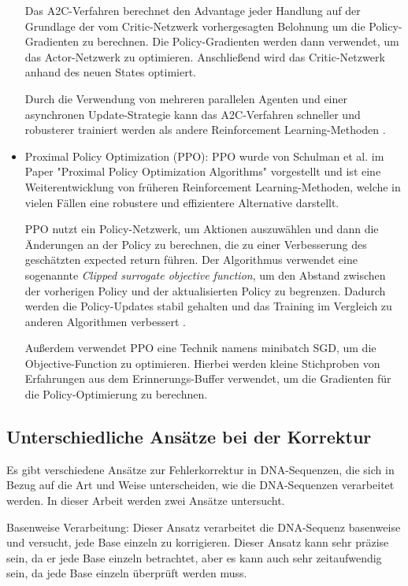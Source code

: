 \documentclass[oneside,bibliography=totocnumbered,BCOR=5mm]{scrbook}%
\theoremstyle{definition}
\theoremstyle{definition}
\theoremstyle{definition}
\theoremstyle{definition}
\theoremstyle{definition}
\theoremstyle{definition}
\begin{document}
\begin{itemize}
  Das A2C-Verfahren berechnet den Advantage jeder Handlung auf der Grundlage der
  vom Critic-Netzwerk vorhergesagten Belohnung um die Policy-Gradienten zu berechnen. 
  Die Policy-Gradienten werden dann verwendet, um das Actor-Netzwerk zu optimieren. 
  Anschließend wird das Critic-Netzwerk anhand des neuen States optimiert.
  
  Durch die Verwendung von mehreren parallelen Agenten und einer asynchronen 
  Update-Strategie kann das A2C-Verfahren schneller und robusterer trainiert 
  werden als andere Reinforcement Learning-Methoden \autocite[Seite 3]{A2C}. 


  \item Proximal Policy Optimization (PPO): PPO wurde von Schulman et al. im Paper "Proximal Policy Optimization Algorithms" 
  vorgestellt und ist eine Weiterentwicklung von früheren Reinforcement Learning-Methoden, welche in
  vielen Fällen eine robustere und effizientere Alternative darstellt.

  PPO nutzt ein Policy-Netzwerk, um Aktionen auszuwählen und dann die Änderungen 
  an der Policy zu berechnen, die zu einer Verbesserung des geschätzten expected return führen. 
  Der Algorithmus verwendet eine sogenannte \textit{Clipped surrogate objective function}, 
  um den Abstand zwischen der vorherigen Policy und der aktualisierten Policy zu begrenzen. \autocite[Seite 3]{PPO}
  Dadurch werden die Policy-Updates stabil gehalten und das Training im Vergleich zu anderen Algorithmen verbessert \autocite[Seite 7]{PPO}.
  
  Außerdem verwendet PPO eine Technik namens minibatch SGD, um die Objective-Function zu optimieren. 
  Hierbei werden kleine Stichproben von Erfahrungen aus dem Erinnerungs-Buffer verwendet, 
  um die Gradienten für die Policy-Optimierung zu berechnen.

\end{itemize}

\subsection{Unterschiedliche Ansätze bei der Korrektur}


Es gibt verschiedene Ansätze zur Fehlerkorrektur in DNA-Sequenzen, 
die sich in Bezug auf die Art und Weise unterscheiden, wie die DNA-Sequenzen verarbeitet werden. 
In dieser Arbeit werden zwei Ansätze untersucht.


Basenweise Verarbeitung: Dieser Ansatz verarbeitet die DNA-Sequenz basenweise und versucht, 
jede Base einzeln zu korrigieren. 
Dieser Ansatz kann sehr präzise sein, da er jede Base einzeln betrachtet, 
aber es kann auch sehr zeitaufwendig sein, da jede Base einzeln überprüft werden muss.
\end{document}
